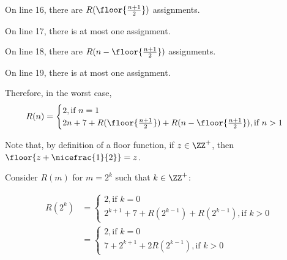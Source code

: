 \documentclass[11pt]{scrartcl}
\begin{document}
On line 16, there are $R(\floor{\frac{n+1}{2}})$ assignments.

On line 17, there is at most one assignment.

On line 18, there are $R(n-\floor{\frac{n+1}{2}})$ assignments.

On line 19, there is at most one assignment.

Therefore, in the worst case, 
\begin{equation*}
  R(n) = \begin{cases}
    2 , \text{if }  n =1\\
    2n+7 + R(\floor{\frac{n+1}{2}}) + R(n-\floor{\frac{n+1}{2}}), \text{if } n > 1
  \end{cases}
\end{equation*}

Note that, by definition of a floor function, if $z\in\ZZ^+$, then $\floor{z+\nicefrac{1}{2}} = z$.

Consider $R(m)$ for $m= 2^{k} $ such that  $k\in\ZZ^+$:

\begin{align*}
  R(2^{k}) &=
             \begin{cases}
               2 , \text{if }  k =0\\
               2^{k+1}+7 + R(2^{k-1}) + R(2^{k-1}), \text{if } k > 0
         \end{cases}\\
       &=
         \begin{cases}
           2 , \text{if }  k =0\\
           7+2^{k+1}+ 2R(2^{k-1}), \text{if } k > 0
         \end{cases}\\
\end{align*}
\end{document}
